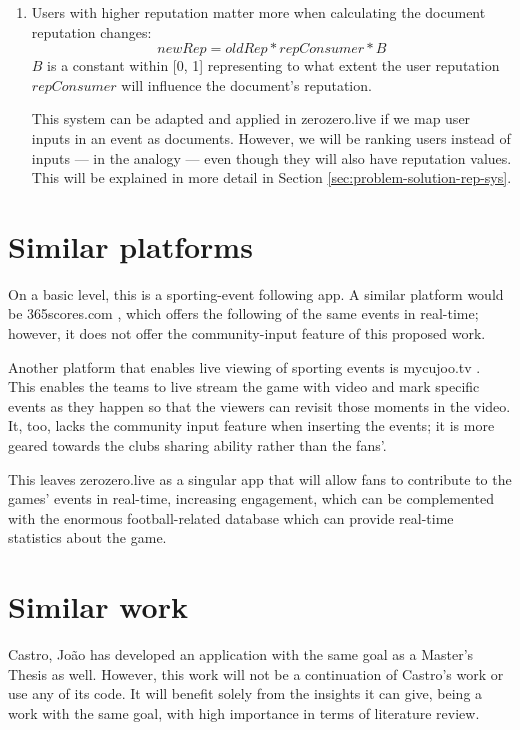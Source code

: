 \begin{enumerate}
    \item Users with higher reputation matter more when calculating the document reputation changes:
    \begin{equation}
        newRep = oldRep * repConsumer * B
    \end{equation}
    $B$ is a constant within [0, 1] representing to what extent the user reputation $repConsumer$ will influence the document's reputation.

    This system can be adapted and applied in zerozero.live if we map user inputs in an event as documents. However, we will be ranking users instead of inputs ---  in the analogy --- even though they will also have reputation values. This will be explained in more detail in Section \ref{sec:problem-solution-rep-sys}.
    
\end{enumerate} 

\section{Similar platforms}

On a basic level, this is a sporting-event following app. A similar platform would be 365scores.com \cite{365scores-about}, which offers the following of the same events in real-time; however, it does not offer the community-input feature of this proposed work.

Another platform that enables live viewing of sporting events is mycujoo.tv \cite{mycujoo-about}. This enables the teams to live stream the game with video and mark specific events as they happen so that the viewers can revisit those moments in the video. It, too, lacks the community input feature when inserting the events; it is more geared towards the clubs sharing ability rather than the fans'. 

This leaves zerozero.live as a singular app that will allow fans to contribute to the games' events in real-time, increasing engagement, which can be complemented with the enormous football-related database which can provide real-time statistics about the game.

\section{Similar work}

Castro, João \cite{PedroSousaCastro2020} has developed an application with the same goal as a Master's Thesis as well. However, this work will not be a continuation of Castro's work or use any of its code. It will benefit solely from the insights it can give, being a work with the same goal, with high importance in terms of literature review.

